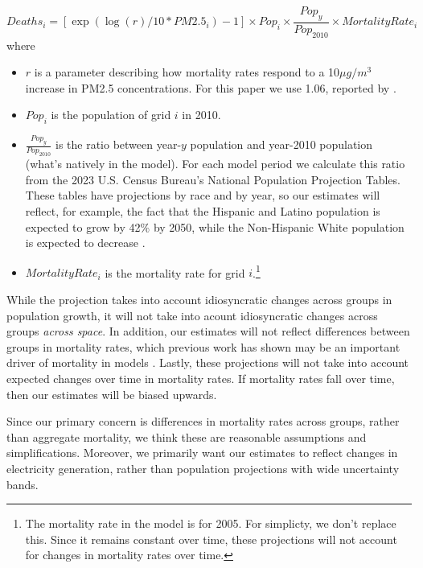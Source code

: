 \documentclass[a4paper]{article}
\theoremstyle{definition}
\theoremstyle{plain}
\begin{document}
\begin{equation}
    Deaths_i = [\exp(\log(r)/10*PM2.5_i)-1]\times Pop_i \times \frac{Pop_y}{Pop_{2010}} \times MortalityRate_i
\end{equation}
where 
\begin{itemize}
    \item $r$ is a parameter describing how mortality rates respond to a 10$\mu g/m^3$ increase in PM2.5 concentrations.  For this paper we use 1.06, reported by \citet{Krewski2009ExtendedInstitute}.
    \item $Pop_i$ is the population of grid $i$ in 2010.
    \item $\frac{Pop_y}{Pop_{2010}}$ is the ratio between year-$y$ population and year-2010 population (what's natively in the model).  For each model period we calculate this ratio from the 2023 U.S. Census Bureau's National Population Projection Tables.  These tables have projections by race and by year, so our estimates will reflect, for example, the fact that the Hispanic and Latino population is expected to grow by 42$\%$ by 2050, while the Non-Hispanic White population is expected to decrease \citep{Bureau2023Series}.
    \item $MortalityRate_i$ is the mortality rate for grid $i$.\footnote{The mortality rate in the model is for 2005.  For simplicty, we don't replace this.  Since it remains constant over time, these projections will not account for changes in mortality rates over time.}
\end{itemize}

While the projection takes into account idiosyncratic changes across groups in population growth, it will not take into acount idiosyncratic changes across groups \textit{across space}.  In addition, our estimates will not reflect differences between groups in mortality rates, which previous work has shown may be an important driver of mortality in models \citep{Spiller2021MortalityOutcomes}.  Lastly, these projections will not take into account expected changes over time in mortality rates. If mortality rates fall over time, then our estimates will be biased upwards.

Since our primary concern is differences in mortality rates across groups, rather than aggregate mortality, we think these are reasonable assumptions and simplifications. Moreover, we primarily want our estimates to reflect changes in electricity generation, rather than population projections with wide uncertainty bands.
\end{document}
